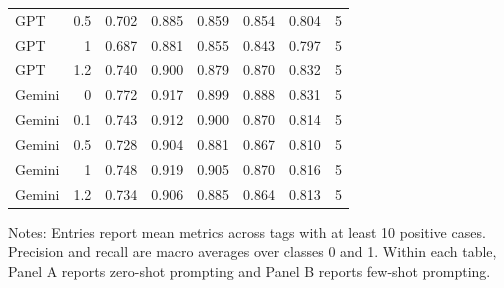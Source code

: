 \begin{table}[htbp]
\begin{threeparttable}
\begin{tabular}{lrrrrrrr}
GPT & 0.5 & 0.702 & 0.885 & 0.859 & 0.854 & 0.804 & 5 \\
GPT & 1 & 0.687 & 0.881 & 0.855 & 0.843 & 0.797 & 5 \\
GPT & 1.2 & 0.740 & 0.900 & 0.879 & 0.870 & 0.832 & 5 \\
Gemini & 0 & 0.772 & 0.917 & 0.899 & 0.888 & 0.831 & 5 \\
Gemini & 0.1 & 0.743 & 0.912 & 0.900 & 0.870 & 0.814 & 5 \\
Gemini & 0.5 & 0.728 & 0.904 & 0.881 & 0.867 & 0.810 & 5 \\
Gemini & 1 & 0.748 & 0.919 & 0.905 & 0.870 & 0.816 & 5 \\
Gemini & 1.2 & 0.734 & 0.906 & 0.885 & 0.864 & 0.813 & 5 \\
\bottomrule
\end{tabular}
\begin{tablenotes}[flushleft]
\footnotesize Notes: Entries report mean metrics across tags with at least 10 positive cases. Precision and recall are macro averages over classes 0 and 1. Within each table, Panel A reports zero-shot prompting and Panel B reports few-shot prompting.
\end{tablenotes}
\end{threeparttable}
\end{table}
